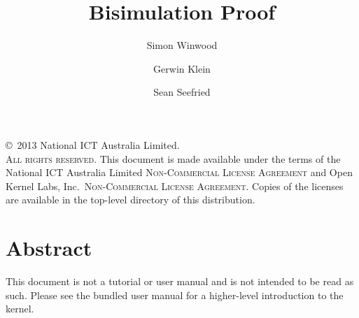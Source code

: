\documentclass[10pt,a4paper]{scrbook}
\begin{document}
\title{Bisimulation Proof}

\author{%
Simon Winwood \and
Gerwin Klein \and
Sean Seefried \and
}


\maketitle

\thispagestyle{empty}

\vfill

\copyright~2013 National ICT Australia Limited.\\

\textsc{All rights reserved}. This document is made available under
the terms of the National ICT Australia Limited
\textsc{Non-Commercial License Agreement} and Open Kernel Labs,
Inc.\ \textsc{Non-Commercial License Agreement}. Copies of the
licenses are available in the top-level directory of this
distribution.

\clearpage

\chapter*{Abstract}

This document is not a tutorial or user manual and is not intended to be read
as such. Please see the bundled user manual for a higher-level introduction to
the kernel.


\cleardoublepage

\tableofcontents



% 
% 
\end{document}
